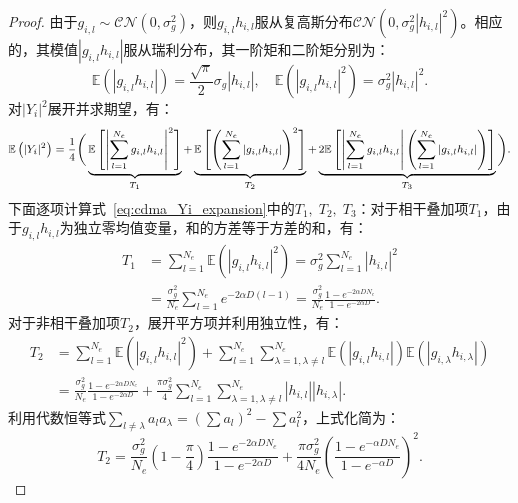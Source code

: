 \begin{proof}
	由于$g_{i,l} \sim \mathcal{CN}(0, \sigma_g^2)$，则$g_{i,l} h_{i,l}$服从复高斯分布$\mathcal{CN}(0, \sigma_g^2 |h_{i,l}|^2)$。相应的，其模值$|g_{i,l} h_{i,l}|$服从瑞利分布，其一阶矩和二阶矩分别为：
	\begin{equation}
		\mathbb{E}(|g_{i,l} h_{i,l}|) = \frac{\sqrt{\pi}}{2} \sigma_g |h_{i,l}|, \quad
		\mathbb{E}(|g_{i,l} h_{i,l}|^2) = \sigma_g^2 |h_{i,l}|^2.
	\end{equation}
	对$|Y_i|^2$展开并求期望，有：
	\begin{equation}\label{eq:cdma_Yi_expansion}
		\medmath{
		\mathbb{E}\left( |Y_i|^2 \right) = \frac{1}{4}
		\Bigg ( \underbrace{\mathbb{E}\left[ \left| \sum_{l=1}^{N_e} g_{i,l} h_{i,l} \right|^2 \right]}_{T_1} 
		+ 
		\underbrace{\mathbb{E}\left[ \left( \sum_{l=1}^{N_e} |g_{i,l} h_{i,l}| \right)^2 \right]}_{T_2} 
		+ 
		\underbrace{2 \mathbb{E}\left[ \left| \sum_{l=1}^{N_e} g_{i,l} h_{i,l} \right| \left( \sum_{l=1}^{N_e} |g_{i,l} h_{i,l}| \right) \right]}_{T_3} \Bigg ).
		}
	\end{equation}
	下面逐项计算式~\eqref{eq:cdma_Yi_expansion}中的$T_1,\;T_2,\;T_3$：对于相干叠加项$T_1$，由于$g_{i,l} h_{i,l}$为独立零均值变量，和的方差等于方差的和，有：
	\begin{align}
		T_1
		&= \sum_{l=1}^{N_e} \mathbb{E}(|g_{i,l} h_{i,l}|^2) = \sigma_g^2 \sum_{l=1}^{N_e} |h_{i,l}|^2 \\
		&= \frac{\sigma_g^2}{N_e} \sum_{l=1}^{N_e} e^{-2\alpha D (l-1)} = \frac{\sigma_g^2}{N_e} \frac{1 - e^{-2\alpha D N_e}}{1 - e^{-2\alpha D}}.
	\end{align}
	对于非相干叠加项$T_2$，展开平方项并利用独立性，有：
	\begin{align}
		T_2 
		&= \sum_{l=1}^{N_e} \mathbb{E}(|g_{i,l} h_{i,l}|^2) +
		\sum_{l=1}^{N_e}\sum_{\lambda=1,\lambda \neq l}^{N_e} \mathbb{E}(|g_{i,l} h_{i,l}|) \mathbb{E}(|g_{i,\lambda} h_{i,\lambda}|) \\
		&= \frac{\sigma_g^2}{N_e} \frac{1 - e^{-2\alpha D N_e}}{1 - e^{-2\alpha D}}
		+ \frac{\pi \sigma_g^2}{4} \sum_{l=1}^{N_e}\sum_{\lambda=1,\lambda \neq l}^{N_e} |h_{i,l}| |h_{i,\lambda}|.
	\end{align}
	利用代数恒等式$\sum_{l \neq \lambda} a_l a_\lambda = (\sum a_l)^2 - \sum a_l^2$，上式化简为：
	\begin{equation}
		T_2
		= \frac{\sigma_g^2}{N_e} \left(1 - \frac{\pi}{4}\right) \frac{1 - e^{-2\alpha D N_e}}{1 - e^{-2\alpha D}}
		+ \frac{\pi \sigma_g^2}{4 N_e} \left(\frac{1 - e^{-\alpha D N_e}}{1 - e^{-\alpha D}}\right)^2.
	\end{equation}

\end{proof}
